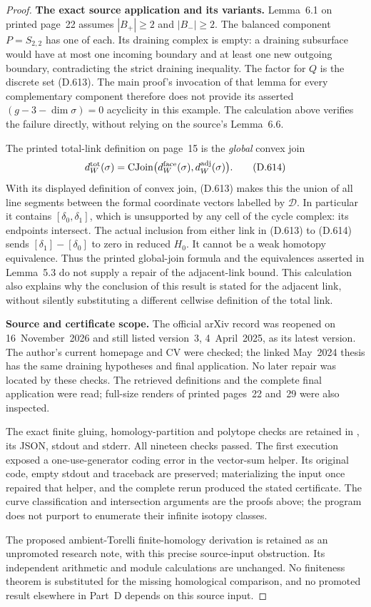 \begin{proof}
\medskip\noindent\textbf{The exact source application and its variants.}
Lemma~6.1 on printed page~22 assumes
$|B_+|\ge2$ and $|B_-|\ge2$.
The balanced component $P=S_{2,2}$ has one of each.
Its draining complex is empty: a draining subsurface
would have at most one incoming boundary and at
least one new outgoing boundary, contradicting the
strict draining inequality.  The factor for $Q$ is
the discrete set (D.613).  The main proof's invocation
of that lemma for every complementary component
therefore does not provide its asserted
$(g-3-\dim\sigma)=0$ acyclicity in this example.
The calculation above verifies the failure directly,
without relying on the source's Lemma~6.6.

The printed total-link definition on page~15 is
the \emph{global} convex join
\[
 d_W^{\rm tot}(\sigma)=
   \operatorname{CJoin}
       \bigl(d_W^{\rm face}(\sigma),d_W^{\rm adj}(\sigma)\bigr).
 \tag{D.614}
\]
With its displayed definition of convex join, (D.613)
makes this the union of all line segments between
the formal coordinate vectors labelled by
$\mathscr D$.  In particular it contains
$[\delta_0,\delta_1]$, which is unsupported by any
cell of the cycle complex: its endpoints intersect.
The actual inclusion from either link in (D.613)
to (D.614) sends
$[\delta_1]-[\delta_0]$ to zero in reduced $H_0$.
It cannot be a weak homotopy equivalence.
Thus the printed global-join formula and the
equivalences asserted in Lemma~5.3 do not supply
a repair of the adjacent-link bound.  This calculation
also explains why the conclusion of this result is
stated for the adjacent link, without silently
substituting a different cellwise definition of the
total link.

\medskip\noindent\textbf{Source and certificate scope.}
The official arXiv record was reopened on
16~November~2026 and still listed version~3,
4~April~2025, as its latest version.
The author's current homepage and CV were checked;
the linked May~2024 thesis has the same draining
hypotheses and final application.
No later repair was located by these checks.
The retrieved definitions and the complete final
application were read; full-size renders of printed
pages~22 and~29 were also inspected.

The exact finite gluing, homology-partition and
polytope checks are retained in
, its JSON,
stdout and stderr.  All nineteen checks passed.
The first execution exposed a one-use-generator
coding error in the vector-sum helper.  Its original
code, empty stdout and traceback are preserved;
materializing the input once repaired that helper,
and the complete rerun produced the stated certificate.
The curve classification and intersection arguments
are the proofs above; the program does not purport
to enumerate their infinite isotopy classes.

The proposed ambient-Torelli finite-homology derivation
is retained as an unpromoted research note, with
this precise source-input obstruction.
Its independent arithmetic and module calculations
are unchanged.  No finiteness theorem is substituted
for the missing homological comparison, and no
promoted result elsewhere in Part~D depends on
this source input.
\end{proof}
